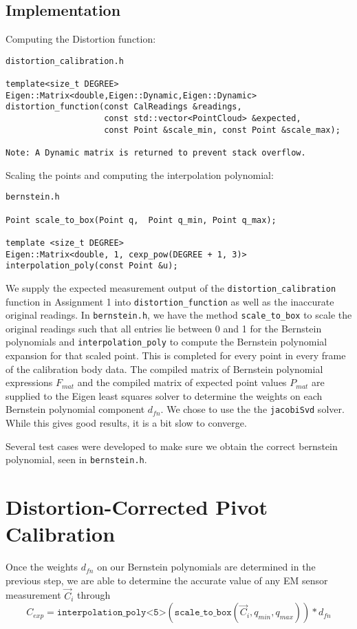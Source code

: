 \documentclass[letterpaper, 11pt]{report}
\begin{document}
\subsection*{Implementation}
Computing the Distortion function:
\begin{verbatim}
distortion_calibration.h

template<size_t DEGREE>
Eigen::Matrix<double,Eigen::Dynamic,Eigen::Dynamic>
distortion_function(const CalReadings &readings,
                    const std::vector<PointCloud> &expected,
                    const Point &scale_min, const Point &scale_max);

Note: A Dynamic matrix is returned to prevent stack overflow.
 \end{verbatim}
 Scaling the points and computing the interpolation polynomial:
 \begin{verbatim}
bernstein.h
 
Point scale_to_box(Point q,  Point q_min, Point q_max);

template <size_t DEGREE>
Eigen::Matrix<double, 1, cexp_pow(DEGREE + 1, 3)>
interpolation_poly(const Point &u);
 \end{verbatim}

We supply the expected measurement output of the \texttt{distortion\_calibration} function in Assignment 1 into \texttt{distortion\_function} as well as the inaccurate original readings. In \texttt{bernstein.h}, we have the method \texttt{scale\_to\_box} to scale the original readings such that all entries lie between 0 and 1 for the Bernstein polynomials and \texttt{interpolation\_poly} to compute the Bernstein polynomial expansion for that scaled point. This is completed for every point in every frame of the calibration body data. The compiled matrix of Bernstein polynomial expressions $F_{mat}$ and the compiled matrix of expected point values $P_{mat}$ are supplied to the Eigen least squares solver to determine the weights on each Bernstein polynomial component $d_{fn}$. We chose to use the the \texttt{jacobiSvd} solver. While this gives good results, it is a bit slow to converge.

Several test cases were developed to make sure we obtain the correct bernstein polynomial, seen in \texttt{bernstein.h}.
\section{Distortion-Corrected Pivot Calibration}
Once the weights $d_{fn}$ on our Bernstein polynomials are determined in the previous step, we are able to determine the accurate value of any EM sensor measurement $\vec C_i$ through
$$C_{exp} = \texttt{interpolation\_poly<5>}(\texttt{scale\_to\_box}(\vec C_i, q_{min},q_{max})) * d_{fn}$$ 
\end{document}
